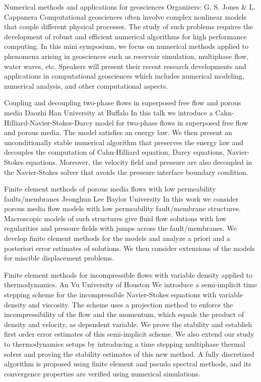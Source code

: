 \label{mini13}

\miniabs
{Numerical methods and applications for geosciences}
{Organizers: G. S. Jones \& L. Cappanera}
{Computational geosciences often involve complex nonlinear models that couple different physical processes. The study of such problems requires the development of robust and efficient numerical algorithms for high performance computing. In this mini symposium, we focus on numerical methods applied to phenomena arising in geosciences such as reservoir simulation, multiphase flow, water waves, etc. Speakers will present their recent research developments and applications in computational geosciences which includes numerical modeling, numerical analysis, and other computational aspects.}

\begin{addmargin}[2em]{0em}
\vspace{2ex}
\abs
{Coupling and decoupling two-phase flows in superposed free flow and porous media}
{Daozhi Han}
{University at Buffalo}
{In this talk we introduce a Cahn-Hilliard-Navier-Stokes-Darcy model for two-phase flows in superposed free flow and porous media. The model satisfies an energy law. We then present an unconditionally stable numerical algorithm that preserves the energy law and decouples the computation of Cahn-Hilliard equation, Darcy equations, Navier-Stokes equations. Moreover, the velocity field and pressure are also decoupled in the Navier-Stokes solver that avoids the pressure interface boundary condition.}


\vspace{1.5ex}
\abs
{Finite element methods of porous media flows with low permeability faults/membranes}
{Jeonghun Lee}
{Baylor University}
{In this work we consider porous media flow models with low permeability fault/membrane structures.
Macroscopic models of such structures give fluid flow solutions with low regularities and pressure fields with jumps across the fault/membranes. We develop finite element methods for the models and analyze a priori and a posteriori error estimates of solutions. We then consider extensions of the models for miscible displacement problems.}


\vspace{1.5ex}
\abs
{Finite element methods for incompressible flows with variable density applied to thermodynamics.}
{An Vu}
{University of Houston}
{We introduce a semi-implicit time stepping scheme for the incompressible Navier-Stokes equations with variable density and viscosity. The scheme uses a projection method to enforce the incompressibility of the flow and the momentum, which equals the product of density and velocity, as dependent variable. We prove the stability and establish first order error estimates of this semi-implicit scheme. We also extend our study to thermodynamics setups by introducing a time stepping multiphase thermal solver and proving the stability estimates of this new method. A fully discretized algorithm is proposed using finite element and pseudo spectral methods, and its convergence properties are verified using numerical simulations.}



\end{addmargin}
